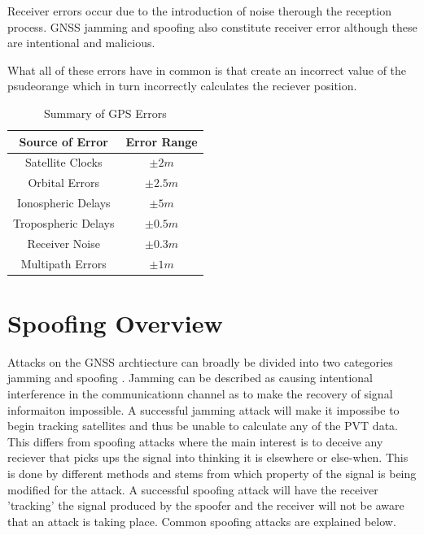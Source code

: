 Receiver errors occur due to the introduction of noise therough the reception process. GNSS jamming and spoofing also constitute receiver error although these are
intentional and malicious.

What all of these errors have in common is that create an incorrect value of the psudeorange which in turn incorrectly calculates the reciever position.

\renewcommand{\arraystretch}{1.5}
\begin{table}
    \begin{center}
        \caption{Summary of GPS Errors}
        \label{tab:GPS Errors}
        \begin{tabular}{ |c|c| }
            \hline
            \textbf{Source of Error} & \textbf{Error Range} \\
            \hline
            Satellite Clocks & $\pm 2m$\\
            \hline
            Orbital Errors & $\pm 2.5m$\\
            \hline
            Ionospheric Delays & $\pm 5m$\\
            \hline
            Tropospheric Delays & $\pm 0.5m$\\
            \hline
            Receiver Noise & $\pm 0.3m$\\
            \hline
            Multipath Errors & $\pm 1m$\\
            \hline
        \end{tabular}
    \end{center}
\end{table}
\renewcommand{\arraystretch}{1}


\section{Spoofing Overview}
Attacks on the GNSS archtiecture can broadly be divided into two categories jamming and spoofing \cite{RN33} \cite{RN32}. Jamming can be described as causing intentional
interference in the communicationn channel as to make the recovery of signal informaiton impossible. A successful jamming attack will make it impossibe to begin tracking
satellites and thus be unable to calculate any of the PVT data. This differs from spoofing attacks where the main interest is to deceive any reciever that picks ups the
signal into thinking it is elsewhere or else-when. This is done by different methods and stems from which property of the signal is being modified for the attack. A
successful spoofing attack will have the receiver 'tracking' the signal produced by the spoofer and the receiver will not be aware that an attack is taking place. Common
spoofing attacks are explained below.

